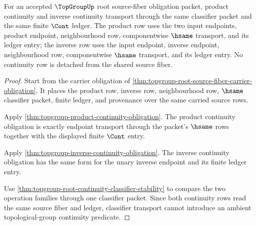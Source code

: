 \begin{theorem}
\label{thm:topgroup-root-source-fiber-continuity-obligation}
For an accepted $\TopGroupUp$ root source-fiber obligation packet, product
continuity and inverse continuity transport through the same classifier packet
and the same finite $\Cont$ ledger. The product row uses the two input
endpoints, product endpoint, neighbourhood row, componentwise $\hsame$
transport, and its ledger entry; the inverse row uses the input endpoint,
inverse endpoint, neighbourhood row, componentwise $\hsame$ transport, and
its ledger entry. No continuity row is detached from the shared source fiber.
\end{theorem}
\begin{proof}
Start from the carrier obligation of
\autoref{thm:topgroup-root-source-fiber-carrier-obligation}. It places the
product row, inverse row, neighbourhood row, $\hsame$ classifier packet,
finite ledger, and provenance over the same carried source rows.

Apply \autoref{thm:topgroup-product-continuity-obligation}. The product
continuity obligation is exactly endpoint transport through the packet's
$\hsame$ rows together with the displayed finite $\Cont$ entry.

Apply \autoref{thm:topgroup-inverse-continuity-obligation}. The inverse
continuity obligation has the same form for the unary inverse endpoint and its
finite ledger entry.

Use \autoref{thm:topgroup-root-continuity-classifier-stability} to compare
the two operation families through one classifier packet. Since both
continuity rows read the same source fiber and ledger, classifier transport
cannot introduce an ambient topological-group continuity predicate.
\end{proof}

